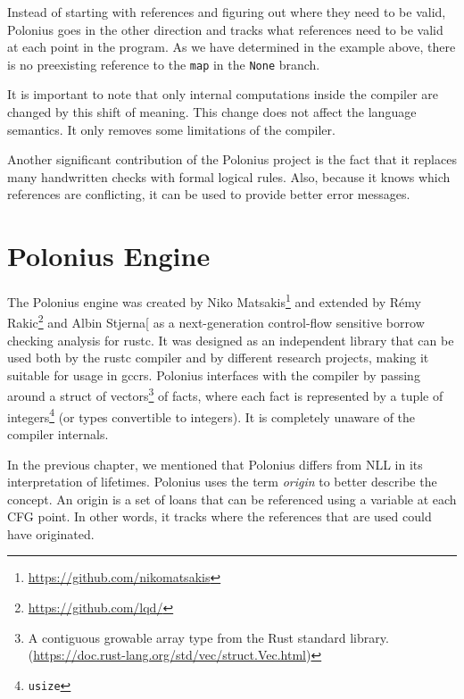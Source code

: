 \documentclass[
  11pt,
  twoside]{report}
\DeclareRobustCommand{\href}[2]{#2\footnote{\url{#1}}}
\begin{document}
Instead of starting with references and figuring out where they need to
be valid, Polonius goes in the other direction and tracks what
references need to be valid at each point in the program. As we have
determined in the example above, there is no preexisting reference to
the \texttt{map} in the \texttt{None} branch.

It is important to note that only internal computations inside the
compiler are changed by this shift of meaning. This change does not
affect the language semantics. It only removes some limitations of the
compiler.

Another significant contribution of the Polonius project is the fact
that it replaces many handwritten checks with formal logical rules.
Also, because it knows which references are conflicting, it can be used
to provide better error messages.

\chapter{Polonius Engine}\label{sec:polonius-engine}

The Polonius engine was created by
\href{https://github.com/nikomatsakis}{Niko Matsakis} and extended by
\href{https://github.com/lqd/}{Rémy Rakic} and Albin
Stjerna{[}\citeproc{ref-Stjerna2020}{8}{]} as a next-generation
control-flow sensitive borrow checking analysis for rustc. It was
designed as an independent library that can be used both by the rustc
compiler and by different research projects, making it suitable for
usage in gccrs. Polonius interfaces with the compiler by passing around
a struct of vectors\footnote{A contiguous growable array type from the
  Rust standard library.
  (\url{https://doc.rust-lang.org/std/vec/struct.Vec.html})} of facts,
where each fact is represented by a tuple of integers\footnote{\texttt{usize}}
(or types convertible to integers). It is completely unaware of the
compiler internals.

In the previous chapter, we mentioned that Polonius differs from NLL in
its interpretation of lifetimes. Polonius uses the term \emph{origin} to
better describe the concept. An origin is a set of loans that can be
referenced using a variable at each CFG point. In other words, it tracks
where the references that are used could have originated.
\end{document}
